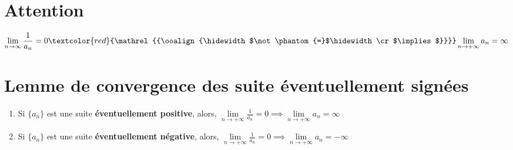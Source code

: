 \documentclass{report}
\newcommand{\notimplies}{%
  \mathrel{{\ooalign{\hidewidth$\not\phantom{=}$\hidewidth\cr$\implies$}}}}
\begin{document}
\begin{multicols*}{3}
    \section{Attention}
        \begin{align*}
            \lim\limits_{n\to\infty  }\frac{1}{a_n} = 0 
            \textcolor{red}{\notimplies}
            \lim\limits_{n\to+\infty }a_n  = \infty
        \end{align*}    

    \section{Lemme de convergence des suite éventuellement signées}



        \begin{enumerate}
            \item 
                Si $\{ a_n \}$ est une suite 
                \textbf{éventuellement positive}, 
                alors,  
                    $\lim\limits_{n\to+\infty }\frac{1}{a_n}  = 0 
                    \implies 
                    \lim\limits_{n\to+\infty }a_n  = \infty$
            \item                                 
                Si $\{ a_n \}$ est une suite 
                \textbf{éventuellement négative}, 
                alors,   
                    $\lim\limits_{n\to+\infty }\frac{1}{a_n}  = 0 
                    \implies 
                    \lim\limits_{n\to+\infty }a_n  = -\infty$
        \end{enumerate} 


 


\end{multicols*}
\end{document}
